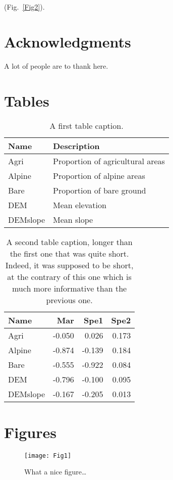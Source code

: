 \documentclass[a4paper,12pt]{article}
\begin{document}
 (Fig.~\ref{Fig2}). 



\section*{Acknowledgments}

A lot of people are to thank here.


\newpage





\newpage


\section*{Tables}


\begin{table}[h!]
  \caption{A first table caption.}
  \label{Tab1}
  \begin{center}
    \begin{tabular}{p{3cm}p{10cm}}
      Name & Description \\
      \hline
      Agri & Proportion of agricultural areas \\
      Alpine & Proportion of alpine areas \\
      Bare & Proportion of bare ground \\
      DEM & Mean elevation \\
      DEMslope & Mean slope \\
      \hline
    \end{tabular}
  \end{center}
\end{table}


\newpage


\begin{table}[h!]
  \caption{A second table caption, longer than the first one that was
quite short. Indeed, it was supposed to be short, at the contrary of this one which is
much more informative than the previous one.}
  \label{Tab2}
  \begin{center}
    \begin{tabular}{lrrr}
      Name & Mar & Spe1 & Spe2 \\
      \hline
      Agri & -0.050 & 0.026 & 0.173 \\
      Alpine & -0.874 & -0.139 & 0.184 \\
      Bare & -0.555 & -0.922 & 0.084 \\
      DEM & -0.796 & -0.100 & 0.095 \\
      DEMslope & -0.167 & -0.205 & 0.013 \\
      \hline
    \end{tabular}
  \end{center}
\end{table}


\newpage


\section*{Figures}


\begin{figure}[h!]
  \caption{What a nice figure\dots}
  \label{Fig1}
  \begin{center}
    \texttt{[image: Fig1]}
  \end{center}
\end{figure}


\newpage
\end{document}
